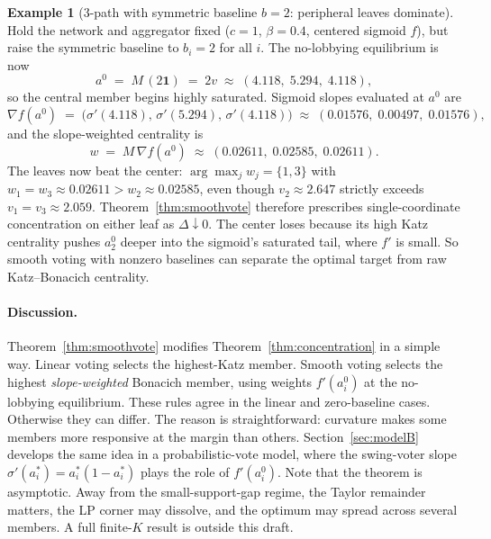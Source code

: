 \documentclass[11pt,letterpaper]{article}
\theoremstyle{plain}
\theoremstyle{definition}
\newtheorem{example}{Example}
\theoremstyle{remark}
\begin{document}
\begin{example}[3-path with symmetric baseline $b = 2$: peripheral leaves dominate]\label{ex:smooth_flip}
Hold the network and aggregator fixed ($c = 1$, $\beta = 0.4$, centered sigmoid $f$), but raise the symmetric baseline to $b_i = 2$ for all $i$. The no-lobbying equilibrium is now
\[
a^0 \;=\; M\,(2\mathbf{1}) \;=\; 2 v \;\approx\; (4.118,\; 5.294,\; 4.118),
\]
so the central member begins highly saturated. Sigmoid slopes evaluated at $a^0$ are
\[
\nabla f(a^0) \;=\; \bigl(\sigma'(4.118),\, \sigma'(5.294),\, \sigma'(4.118)\bigr) \;\approx\; (0.01576,\; 0.00497,\; 0.01576),
\]
and the slope-weighted centrality is
\[
w \;=\; M\, \nabla f(a^0) \;\approx\; (0.02611,\; 0.02585,\; 0.02611).
\]
The leaves now beat the center: $\arg\max_j w_j = \{1, 3\}$ with $w_1 = w_3 \approx 0.02611 > w_2 \approx 0.02585$, even though $v_2 \approx 2.647$ strictly exceeds $v_1 = v_3 \approx 2.059$. Theorem~\ref{thm:smoothvote} therefore prescribes single-coordinate concentration on either leaf as $\Delta \downarrow 0$. The center loses because its high Katz centrality pushes $a^0_2$ deeper into the sigmoid's saturated tail, where $f'$ is small. So smooth voting with nonzero baselines can separate the optimal target from raw Katz--Bonacich centrality.
\end{example}

\paragraph{Discussion.} Theorem~\ref{thm:smoothvote} modifies Theorem~\ref{thm:concentration} in a simple way. Linear voting selects the highest-Katz member. Smooth voting selects the highest \emph{slope-weighted} Bonacich member, using weights $f'(a^0_i)$ at the no-lobbying equilibrium. These rules agree in the linear and zero-baseline cases. Otherwise they can differ. The reason is straightforward: curvature makes some members more responsive at the margin than others. Section~\ref{sec:modelB} develops the same idea in a probabilistic-vote model, where the swing-voter slope $\sigma'(a_i^*) = a_i^*(1 - a_i^*)$ plays the role of $f'(a^0_i)$. Note that the theorem is asymptotic. Away from the small-support-gap regime, the Taylor remainder matters, the LP corner may dissolve, and the optimum may spread across several members. A full finite-$K$ result is outside this draft.

\end{document}
